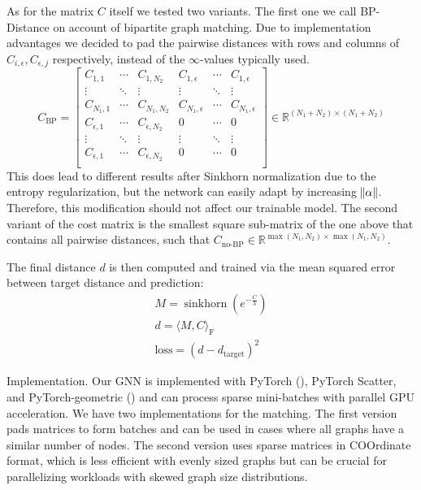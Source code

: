 As for the matrix $C$ itself we tested two variants. The first one we call BP-Distance on account of bipartite graph matching. Due to implementation advantages we decided to pad the pairwise distances with rows and columns of $C_{i, \epsilon}, C_{\epsilon, j}$ respectively, instead of the $\infty$-values typically used.
\begin{equation}
     C_\text{BP}=
          \left[
          \begin{array}{ccc|ccc}
               C_{1,1} & \dotsi & C_{1, N_2} & C_{1, \epsilon} & \dotsi & C_{1, \epsilon} \\
               \vdots & \ddots & \vdots & \vdots & \ddots & \vdots \\
               C_{N_1, 1} & \dotsi & C_{N_1, N_2} & C_{N_1, \epsilon} & \dotsi & C_{N_1, \epsilon} \\
               \hline
               C_{\epsilon, 1} & \dotsi & C_{\epsilon, N_2} & 0 & \dotsi & 0 \\
               \vdots & \ddots & \vdots & \vdots & \ddots & \vdots \\
               C_{\epsilon, 1} & \dotsi & C_{\epsilon, N_2} & 0 & \dotsi & 0 \\
          \end{array}
          \right]
     \in \mathbb{R}^{(N_1 + N_2) \times (N_1 + N_2)}
\end{equation}
This does lead to different results after Sinkhorn normalization due to the entropy regularization, but the network can easily adapt by increasing $\norm{\alpha}$. Therefore, this modification should not affect our trainable model. The second variant of the cost matrix is the smallest square sub-matrix of the one above that contains all pairwise distances, such that \mbox{$C_\text{no-BP} \in \mathbb{R}^{\max({N_1, N_2}) \times \max({N_1, N_2})}$}.

The final distance $d$ is then computed and trained via the mean squared error between target distance and prediction:
\begin{equation}
     \begin{gathered}
          M = \operatorname{sinkhorn}\left(e^{-\frac{C}{\lambda}}\right) \\
          d = \langle M, C \rangle_\mathrm{F} \\
          \text{loss} = (d - d_\text{target})^2
     \end{gathered}
\end{equation}

Implementation. Our GNN is implemented with PyTorch (\citealp{pytorch}), PyTorch Scatter, and PyTorch-geometric (\citealp{pytorchgeometric}) and can process sparse mini-batches with parallel GPU acceleration. We have two implementations for the matching. The first version pads matrices to form batches and can be used in cases where all graphs have a similar number of nodes. The second version uses sparse matrices in COOrdinate format, which is less efficient with evenly sized graphs but can be crucial for parallelizing workloads with skewed graph size distributions.


